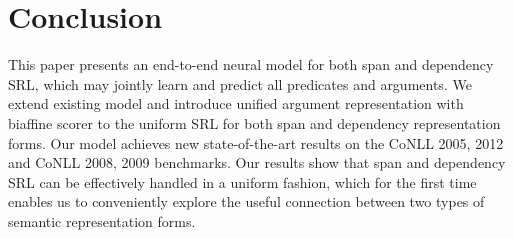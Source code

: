 \documentclass[letterpaper]{article} \usepackage{aaai19}  \usepackage{times}  \usepackage{helvet}  \usepackage{courier}  \usepackage{url}  \usepackage{graphicx}  \frenchspacing  \setlength{\pdfpagewidth}{8.5in}  \setlength{\pdfpageheight}{11in}
\begin{document}
\section{Conclusion}
This paper presents an end-to-end neural model for both span and dependency SRL, which may jointly learn and predict all predicates and arguments. We extend existing model and introduce unified argument representation with biaffine scorer to the uniform SRL for both span and dependency representation forms. Our model achieves new state-of-the-art results on the CoNLL 2005, 2012 and CoNLL 2008, 2009 benchmarks. Our results show that span and dependency SRL can be effectively handled in a uniform fashion, which for the first time enables us to conveniently explore the useful connection between two types of semantic representation forms. 









 

\end{document}
